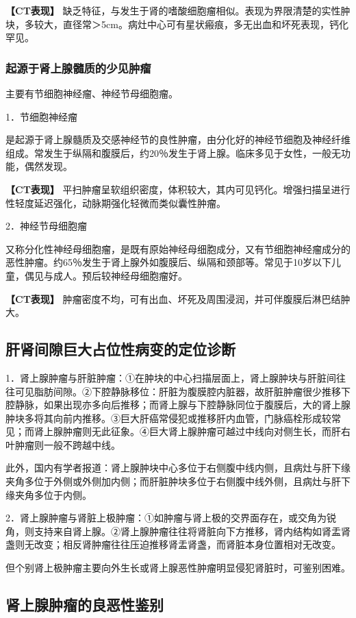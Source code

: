 \textbf{【CT表现】}
缺乏特征，与发生于肾的嗜酸细胞瘤相似。表现为界限清楚的实性肿块，多较大，直径常＞5cm。病灶中心可有星状瘢痕，多无出血和坏死表现，钙化罕见。

\subsubsection{起源于肾上腺髓质的少见肿瘤}

主要有节细胞神经瘤、神经节母细胞瘤。

1．节细胞神经瘤

是起源于肾上腺髓质及交感神经节的良性肿瘤，由分化好的神经节细胞及神经纤维组成。常发生于纵隔和腹膜后，约20％发生于肾上腺。临床多见于女性，一般无功能，偶然发现。

\textbf{【CT表现】}
平扫肿瘤呈软组织密度，体积较大，其内可见钙化。增强扫描呈进行性轻度延迟强化，动脉期强化轻微而类似囊性肿瘤。

2．神经节母细胞瘤

又称分化性神经母细胞瘤，是既有原始神经母细胞成分，又有节细胞神经瘤成分的恶性肿瘤。约65％发生于肾上腺外如腹膜后、纵隔和颈部等。常见于10岁以下儿童，偶见与成人。预后较神经母细胞瘤好。

\textbf{【CT表现】}
肿瘤密度不均，可有出血、坏死及周围浸润，并可伴腹膜后淋巴结肿大。

\subsection{肝肾间隙巨大占位性病变的定位诊断}

1．肾上腺肿瘤与肝脏肿瘤：①在肿块的中心扫描层面上，肾上腺肿块与肝脏间往往可见脂肪间隙。②下腔静脉移位：肝脏为腹膜腔内脏器，故肝脏肿瘤很少推移下腔静脉，如果出现亦多向后推移；而肾上腺与下腔静脉同位于腹膜后，大的肾上腺肿块多将其向前内推移。③巨大肝癌常侵犯或推移肝内血管，门脉癌栓形成较常见；而肾上腺肿瘤则无此征象。④巨大肾上腺肿瘤可越过中线向对侧生长，而肝右叶肿瘤则一般不跨越中线。

此外，国内有学者报道：肾上腺肿块中心多位于右侧腹中线内侧，且病灶与肝下缘夹角多位于外侧或外侧加内侧；而肝脏肿块多位于右侧腹中线外侧，且病灶与肝下缘夹角多位于内侧。

2．肾上腺肿瘤与肾脏上极肿瘤：①如肿瘤与肾上极的交界面存在，或交角为锐角，则支持来自肾上腺。②肾上腺肿瘤往往将肾脏向下方推移，肾内结构如肾盂肾盏则无改变；相反肾肿瘤往往压迫推移肾盂肾盏，而肾脏本身位置相对无改变。

但个别肾上极肿瘤主要向外生长或肾上腺恶性肿瘤明显侵犯肾脏时，可鉴别困难。

\subsection{肾上腺肿瘤的良恶性鉴别}

